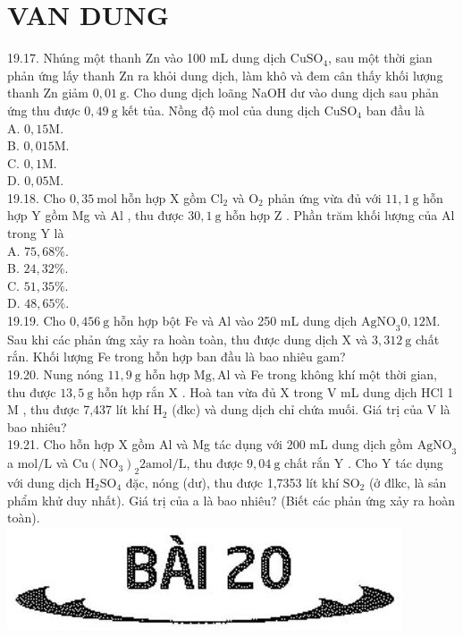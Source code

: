 \documentclass[10pt]{article}
\begin{document}
\section*{VAN DUNG}
19.17. Nhúng một thanh Zn vào 100 mL dung dịch $\mathrm{CuSO}_{4}$, sau một thời gian phản ứng lấy thanh Zn ra khỏi dung dịch, làm khô và đem cân thấy khối lượng thanh Zn giảm $0,01 \mathrm{~g}$. Cho dung dịch loãng NaOH dư vào dung dịch sau phản ứng thu được $0,49 \mathrm{~g}$ kết tủa. Nồng độ mol của dung dịch $\mathrm{CuSO}_{4}$ ban đầu là\\
A. $0,15 \mathrm{M}$.\\
B. $0,015 \mathrm{M}$.\\
C. $0,1 \mathrm{M}$.\\
D. $0,05 \mathrm{M}$.\\
19.18. Cho $0,35 \mathrm{~mol}$ hỗn hợp X gồm $\mathrm{Cl}_{2}$ và $\mathrm{O}_{2}$ phản ứng vừa đủ với $11,1 \mathrm{~g}$ hỗn hợp Y gồm Mg và Al , thu được $30,1 \mathrm{~g}$ hỗn hợp Z . Phần trăm khối lượng của Al trong Y là\\
A. $75,68 \%$.\\
B. $24,32 \%$.\\
C. $51,35 \%$.\\
D. $48,65 \%$.\\
19.19. Cho $0,456 \mathrm{~g}$ hỗn hợp bột Fe và Al vào 250 mL dung dịch $\mathrm{AgNO}_{3} 0,12 \mathrm{M}$. Sau khi các phản ứng xảy ra hoàn toàn, thu được dung dịch X và $3,312 \mathrm{~g}$ chất rắn. Khối lượng Fe trong hỗn hợp ban đầu là bao nhiêu gam?\\
19.20. Nung nóng $11,9 \mathrm{~g}$ hỗn hợp $\mathrm{Mg}, \mathrm{Al}$ và Fe trong không khí một thời gian, thu được $13,5 \mathrm{~g}$ hỗn hợp rắn X . Hoà tan vừa đủ X trong V mL dung dịch HCl 1 M , thu được 7,437 lít khí $\mathrm{H}_{2}$ (đkc) và dung dịch chỉ chứa muối. Giá trị của V là bao nhiêu?\\
19.21. Cho hỗn hợp X gồm Al và Mg tác dụng với 200 mL dung dịch gồm $\mathrm{AgNO}_{3}$ a $\mathrm{mol} / \mathrm{L}$ và $\mathrm{Cu}\left(\mathrm{NO}_{3}\right)_{2} 2 \mathrm{a} \mathrm{mol} / \mathrm{L}$, thu được $9,04 \mathrm{~g}$ chất rắn Y . Cho Y tác dụng với dung dịch $\mathrm{H}_{2} \mathrm{SO}_{4}$ đặc, nóng (dư), thu được 1,7353 lít khí $\mathrm{SO}_{2}$ (ở đlkc, là sản phẩm khử duy nhất). Giá trị của a là bao nhiêu? (Biết các phản ứng xảy ra hoàn toàn).\\
\includegraphics[max width=\textwidth, center]{2025_10_23_74efce88ce3a451fd6b0g-065}
\end{document}
